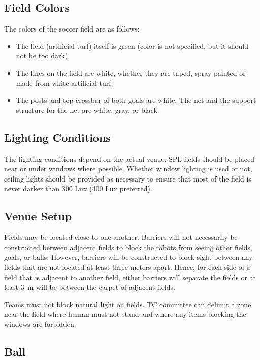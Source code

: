 \subsection{Field Colors}
\label{sec:field_colors}

The colors of the soccer field are as follows:
\begin{itemize}
  \item The field (artificial turf) itself is green (color is not specified, but it should not be too dark).
  \item The lines on the field are white, whether they are taped, spray painted or made from white artificial turf.
  \item The posts and top crossbar of both goals are white.
    The net and the support structure for the net are white, gray, or black.
\end{itemize}

\subsection{Lighting Conditions}
\label{sec:lightConditions}

The lighting conditions depend on the actual venue.
SPL fields should be placed near or under windows where possible.
Whether window lighting is used or not, ceiling lights should be provided as necessary to ensure that most of the field is never darker than 300 Lux (400 Lux preferred).

\subsection{Venue Setup}
\label{sec:boundaries}

Fields may be located close to one another.
Barriers will not necessarily be constructed between adjacent fields to block the robots from seeing other fields, goals, or balls.
However, barriers will be constructed to block sight between any fields that are not located at least three meters apart.
Hence, for each side of a field that is adjacent to another field, either barriers will separate the fields or at least \qty{3}{\metre} will be between the carpet of adjacent fields.

Teams must not block natural light on fields.
TC committee can delimit a zone near the field where human must not stand and where any items blocking the windows are forbidden. 

\subsection{Ball}
\label{sec:ball}

